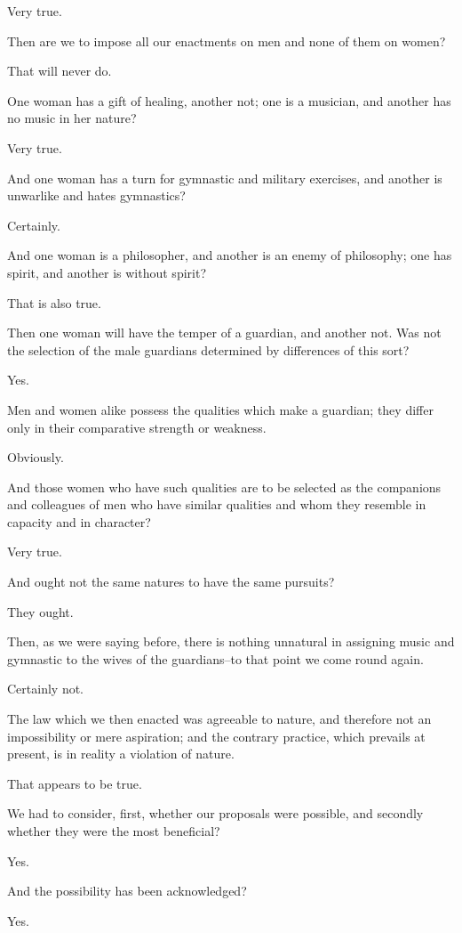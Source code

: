 Very true.

Then are we to impose all our enactments on men and none of them on
women?

That will never do.

One woman has a gift of healing, another not; one is a musician, and
another has no music in her nature?

Very true.

And one woman has a turn for gymnastic and military exercises, and
another is unwarlike and hates gymnastics?

Certainly.

And one woman is a philosopher, and another is an enemy of philosophy;
one has spirit, and another is without spirit?

That is also true.

Then one woman will have the temper of a guardian, and another not. Was
not the selection of the male guardians determined by differences of
this sort?

Yes.

Men and women alike possess the qualities which make a guardian; they
differ only in their comparative strength or weakness.

Obviously.

And those women who have such qualities are to be selected as the
companions and colleagues of men who have similar qualities and whom
they resemble in capacity and in character?

Very true.

And ought not the same natures to have the same pursuits?

They ought.

Then, as we were saying before, there is nothing unnatural in assigning
music and gymnastic to the wives of the guardians--to that point we come
round again.

Certainly not.

The law which we then enacted was agreeable to nature, and therefore not
an impossibility or mere aspiration; and the contrary practice, which
prevails at present, is in reality a violation of nature.

That appears to be true.

We had to consider, first, whether our proposals were possible, and
secondly whether they were the most beneficial?

Yes.

And the possibility has been acknowledged?

Yes.

